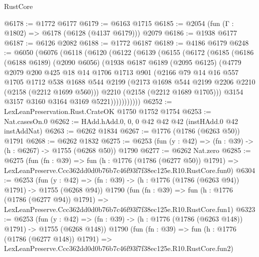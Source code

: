 \begin{lexlean}{RustCore}
\begin{coremodule}
@6178 := @1772 @6177
@6179 := @6163 @1715
@6185 := @2054 (fun (Γ : @1802) => @6178 (@6128 (@4137 @6179))) @2079
@6186 := @1938 @6177
@6187 := @6126 @2082
@6188 := @1772 @6187
@6189 := @4186 @6179
@6248 := @6050
    (@6076
      (@6118
        (@6120
          (@6122
            (@6139
              (@6155
                (@6172
                  (@6185
                    (@6186
                      (@6188 @6189)
                      (@2090 @6056)
                      (@1938
                        @6187
                        @6189
                        (@2095 @6125)
                        (@4779
                          @2079
                          @200
                          @425
                          @18
                          @14
                          @1706
                          @1713
                          @901
                          (@2166
                            @79
                            @14
                            @16
                            @557
                            @1705
                            @1712
                            @538
                            @1688
                            @544
                            @2199
                            (@2173 @1698 @544 @2199 @2206 @2210 (@2158 (@2212 @1699 @560)))
                            @2210
                            (@2158 (@2212 @1689 @1705)))
                          @3154
                          @3157
                          @3160
                          @3164
                          @3169
                          @5221)))))))))))
@6252 := LexLeanPreservation.Rust.CrateOK @1750 @1752 @1754
@6253 := Nat.casesOn.{0}
@6262 := HAdd.hAdd.{0, 0, 0} @42 @42 @42 (instHAdd.{0} @42 instAddNat)
@6263 := @6262 @1834
@6267 := @1776 (@1786 (@6263 @50)) @1791
@6268 := @6262 @1832
@6275 := @6253 (fun (y : @42) => (fn : @39) -> (h : @6267) -> @1755 (@6268 @50)) @1790
@6277 := @6262 Nat.zero
@6285 := @6275
    (fun (fn : @39) =>
    fun (h : @1776 (@1786 (@6277 @50)) @1791) =>
    LexLeanPreserve.Ccc362dd0d0b76b7c46f93f7f38ec125e.R10.RustCore.fun0)
@6304 := @6253
    (fun (y : @42) => (fn : @39) -> (h : @1776 (@1786 (@6263 @94)) @1791) -> @1755 (@6268 @94))
    @1790
    (fun (fn : @39) =>
    fun (h : @1776 (@1786 (@6277 @94)) @1791) =>
    LexLeanPreserve.Ccc362dd0d0b76b7c46f93f7f38ec125e.R10.RustCore.fun1)
@6323 := @6253
    (fun (y : @42) => (fn : @39) -> (h : @1776 (@1786 (@6263 @148)) @1791) -> @1755 (@6268 @148))
    @1790
    (fun (fn : @39) =>
    fun (h : @1776 (@1786 (@6277 @148)) @1791) =>
    LexLeanPreserve.Ccc362dd0d0b76b7c46f93f7f38ec125e.R10.RustCore.fun2)

\end{coremodule}
\end{lexlean}
